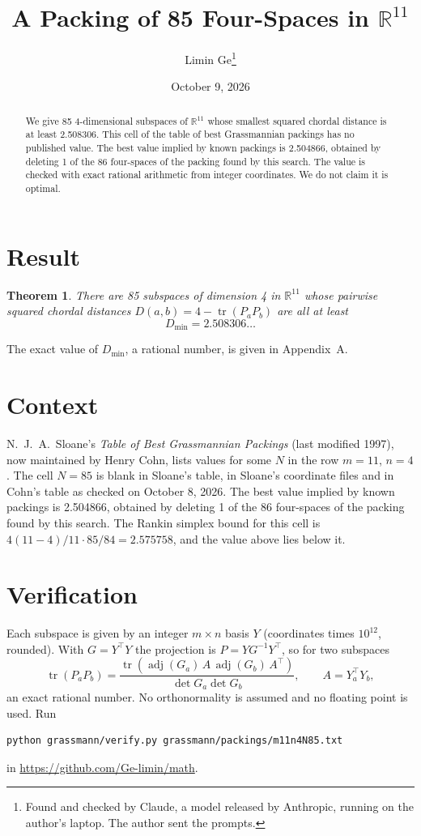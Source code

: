 \documentclass[11pt,a4paper]{article}
\title{A Packing of 85 Four-Spaces in $\mathbb{R}^{11}$}
\author{Limin Ge\thanks{Found and checked by Claude, a model released by Anthropic, running on the author's laptop. The author sent the prompts.}}
\date{October 9, 2026}
\newtheorem*{theorem}{Theorem}
\begin{document}
\maketitle
\begin{abstract}
We give 85 4-dimensional subspaces of $\mathbb{R}^{11}$ whose smallest squared chordal distance is at least 2.508306. This cell of the table of best Grassmannian packings has no published value. The best value implied by known packings is 2.504866, obtained by deleting 1 of the 86 four-spaces of the packing found by this search. The value is checked with exact rational arithmetic from integer coordinates. We do not claim it is optimal.
\end{abstract}

\section{Result}
\begin{theorem}
There are 85 subspaces of dimension 4 in $\mathbb{R}^{11}$ whose pairwise squared chordal distances $D(a,b) = 4 - \operatorname{tr}(P_aP_b)$ are all at least
\[ D_{\min} = 2.508306\ldots \]
\end{theorem}
The exact value of $D_{\min}$, a rational number, is given in Appendix~A.


\section{Context}
N.~J.~A.~Sloane's \emph{Table of Best Grassmannian Packings} (last modified 1997), now maintained by Henry Cohn, lists values for some $N$ in the row $m=11$, $n=4$. The cell $N=85$ is blank in Sloane's table, in Sloane's coordinate files and in Cohn's table as checked on October 8, 2026. The best value implied by known packings is 2.504866, obtained by deleting 1 of the 86 four-spaces of the packing found by this search. The Rankin simplex bound for this cell is $4(11-4)/11\cdot 85/84 = 2.575758$, and the value above lies below it.


\section{Verification}
Each subspace is given by an integer $m\times n$ basis $Y$ (coordinates times $10^{12}$, rounded). With $G=Y^\top Y$ the projection is $P=YG^{-1}Y^\top$, so for two subspaces
\[ \operatorname{tr}(P_aP_b)=\frac{\operatorname{tr}(\operatorname{adj}(G_a)\,A\,\operatorname{adj}(G_b)\,A^\top)}{\det G_a\det G_b},\qquad A=Y_a^\top Y_b, \]
an exact rational number. No orthonormality is assumed and no floating point is used. Run
\begin{verbatim}
python grassmann/verify.py grassmann/packings/m11n4N85.txt
\end{verbatim}
in \url{https://github.com/Ge-limin/math}.
\end{document}
